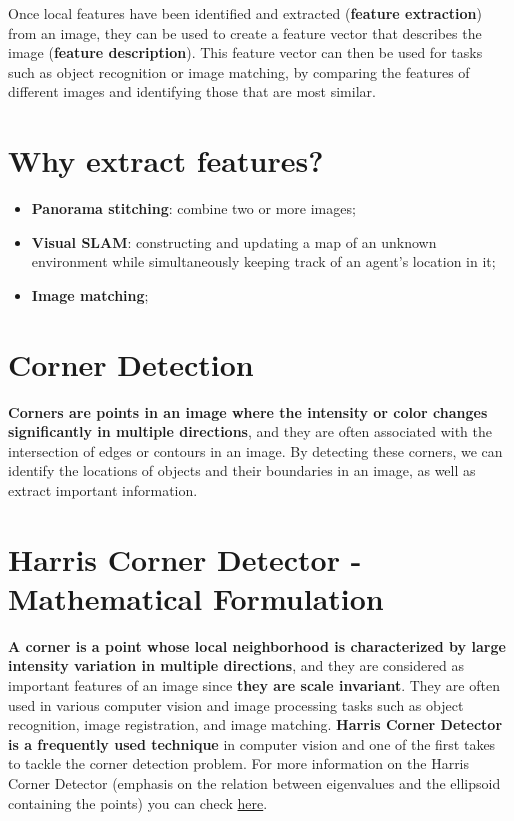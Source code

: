 \documentclass{article}
\begin{document}
Once local features have been identified and extracted (\textbf{feature extraction}) from an image, they can be used to create a feature vector that describes the image (\textbf{feature description}). This feature vector can then be used for tasks such as object recognition or image matching, by comparing the features of different images and identifying those that are most similar.

\section*{Why extract features?}

\begin{itemize}
    \item \textbf{Panorama stitching}: combine two or more images;
    \item \textbf{Visual SLAM}: constructing and updating a map of an unknown environment while simultaneously keeping track of an agent's location in it;
    \item \textbf{Image matching};
\end{itemize}

\section*{Corner Detection}

\textbf{Corners are points in an image where the intensity or color changes significantly in multiple directions}, and they are often associated with the intersection of edges or contours in an image. By detecting these corners, we can identify the locations of objects and their boundaries in an image, as well as extract important information.

\newpage

\section*{Harris Corner Detector - Mathematical Formulation}

\textbf{A corner is a point whose local neighborhood is characterized by large intensity variation in multiple directions}, and they are considered as important features of an image since \textbf{they are scale invariant}. They are often used in various computer vision and image processing tasks such as object recognition, image registration, and image matching. \textbf{Harris Corner Detector is a frequently used technique} in computer vision and one of the first takes to tackle the corner detection problem. For more information on the Harris Corner Detector (emphasis on the relation between eigenvalues and the ellipsoid containing the points) you can check \href{https://guangchun.wordpress.com/2013/02/16/harris-detector/}{here}. \\
\end{document}
